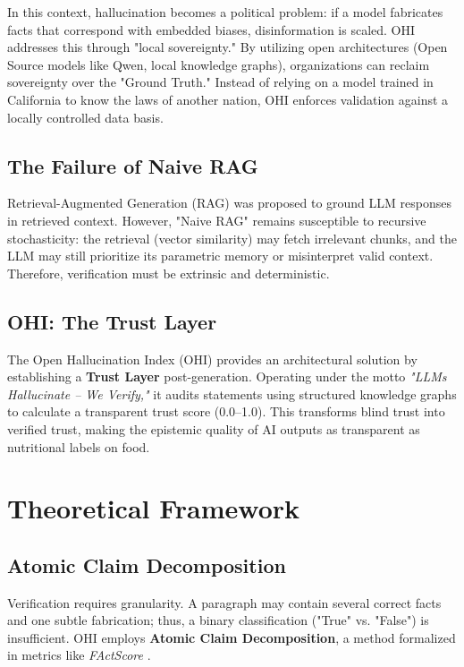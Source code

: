 \documentclass[10pt, a4paper, twocolumn]{article}
\begin{document}
In this context, hallucination becomes a political problem: if a model fabricates facts that correspond with embedded biases, disinformation is scaled. OHI addresses this through "local sovereignty." By utilizing open architectures (Open Source models like Qwen, local knowledge graphs), organizations can reclaim sovereignty over the "Ground Truth." Instead of relying on a model trained in California to know the laws of another nation, OHI enforces validation against a locally controlled data basis.

\subsection{The Failure of Naive RAG}
Retrieval-Augmented Generation (RAG) was proposed to ground LLM responses in retrieved context. However, "Naive RAG" remains susceptible to recursive stochasticity: the retrieval (vector similarity) may fetch irrelevant chunks, and the LLM may still prioritize its parametric memory or misinterpret valid context. Therefore, verification must be extrinsic and deterministic.

\subsection{OHI: The Trust Layer}
The Open Hallucination Index (OHI) provides an architectural solution by establishing a \textbf{Trust Layer} post-generation. Operating under the motto \textit{"LLMs Hallucinate – We Verify,"} it audits statements using structured knowledge graphs to calculate a transparent trust score (0.0--1.0). This transforms blind trust into verified trust, making the epistemic quality of AI outputs as transparent as nutritional labels on food.

\section{Theoretical Framework}

\subsection{Atomic Claim Decomposition}
Verification requires granularity. A paragraph may contain several correct facts and one subtle fabrication; thus, a binary classification ("True" vs. "False") is insufficient. OHI employs \textbf{Atomic Claim Decomposition}, a method formalized in metrics like \textit{FActScore} \cite{min2023}.
\end{document}
